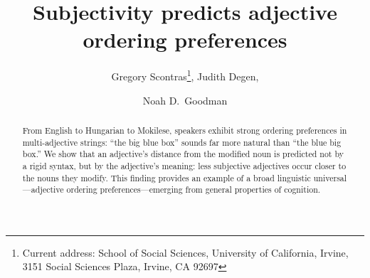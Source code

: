 \documentclass[manuscript]{stjour}
\begin{document}
\title{Subjectivity predicts adjective ordering preferences}



\author[Scontras, Degen, and Goodman]
{Gregory Scontras\thanks{Current address: School of Social Sciences, University of California, Irvine,
3151 Social Sciences Plaza,
Irvine, CA 92697},
Judith Degen, \and Noah D.~Goodman}









\begin{abstract}
From English to Hungarian to Mokilese, speakers exhibit strong ordering preferences in multi-adjective strings: ``the big blue box'' sounds far more natural than ``the blue big box.'' We show that an adjective's distance from the modified noun is predicted not by a rigid syntax, but by the adjective's meaning: less subjective adjectives occur closer to the nouns they modify. 
	This finding provides an example of a broad linguistic universal---adjective ordering preferences---emerging from general properties of cognition. 
\end{abstract}
\end{document}
